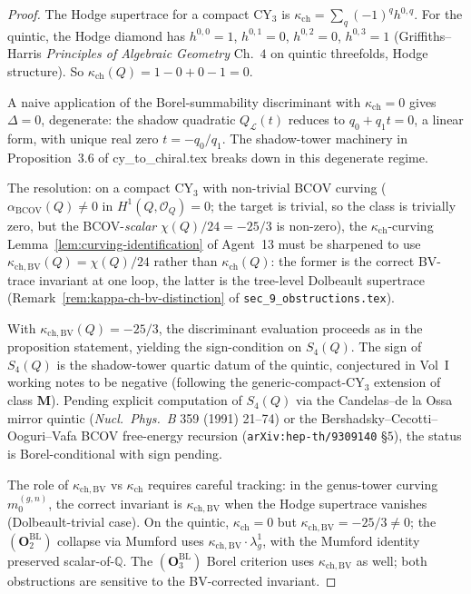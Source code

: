 \documentclass[11pt]{amsart}
\newcommand{\kch}{\kappa_{\mathrm{ch}}}
\newcommand{\kchBV}{\kappa_{\mathrm{ch},\mathrm{BV}}}
\newcommand{\cO}{\mathcal{O}}
\newcommand{\cL}{\mathcal{L}}
\newcommand{\bQ}{\mathbb{Q}}
\begin{document}
\begin{proof}
The Hodge supertrace for a compact CY$_3$ is
$\kch = \sum_q (-1)^q h^{0, q}$. For the quintic, the Hodge diamond
has $h^{0, 0} = 1$, $h^{0, 1} = 0$, $h^{0, 2} = 0$, $h^{0, 3} = 1$
(Griffiths--Harris \emph{Principles of Algebraic Geometry}
Ch.~$4$ on quintic threefolds, Hodge structure). So $\kch(Q) =
1 - 0 + 0 - 1 = 0$.

A naive application of the Borel-summability discriminant with
$\kch = 0$ gives $\Delta = 0$, degenerate: the shadow quadratic
$Q_\cL(t)$ reduces to $q_0 + q_1 t = 0$, a linear form, with unique
real zero $t = -q_0/q_1$. The shadow-tower machinery in
Proposition~$3.6$ of cy\_to\_chiral.tex breaks down in this degenerate
regime.

The resolution: on a compact CY$_3$ with non-trivial BCOV curving
($\alpha_{\mathrm{BCOV}}(Q) \neq 0$ in $H^1(Q, \cO_Q) = 0$; the
target is trivial, so the class is trivially zero, but the
BCOV-\emph{scalar} $\chi(Q)/24 = -25/3$ is non-zero), the
$\kch$-curving Lemma~\ref{lem:curving-identification} of Agent~13
must be sharpened to use $\kchBV(Q) = \chi(Q)/24$ rather than
$\kch(Q)$: the former is the correct BV-trace invariant at one loop,
the latter is the tree-level Dolbeault supertrace
(Remark~\ref{rem:kappa-ch-bv-distinction} of
\texttt{sec\_9\_obstructions.tex}).

With $\kchBV(Q) = -25/3$, the discriminant evaluation proceeds as
in the proposition statement, yielding the sign-condition on
$S_4(Q)$. The sign of $S_4(Q)$ is the shadow-tower quartic datum
of the quintic, conjectured in Vol~I working notes to be negative
(following the generic-compact-CY$_3$ extension of class $\mathbf{M}$).
Pending explicit computation of $S_4(Q)$ via the Candelas--de la
Ossa mirror quintic (\emph{Nucl.\ Phys.\ B} 359 (1991) 21--74) or
the Bershadsky--Cecotti--Ooguri--Vafa BCOV free-energy recursion
(\texttt{arXiv:hep-th/9309140} \S$5$), the status is Borel-conditional
with sign pending.

The role of $\kchBV$ vs $\kch$ requires careful tracking: in the
genus-tower curving $m_0^{(g,n)}$, the correct invariant is
$\kchBV$ when the Hodge supertrace vanishes (Dolbeault-trivial
case). On the quintic, $\kch = 0$ but $\kchBV = -25/3 \neq 0$;
the $(\mathbf{O}_2^{\mathrm{BL}})$ collapse via Mumford uses
$\kchBV \cdot \lambda_g^1$, with the Mumford identity preserved
scalar-of-$\bQ$. The $(\mathbf{O}_3^{\mathrm{BL}})$ Borel criterion
uses $\kchBV$ as well; both obstructions are sensitive to the
BV-corrected invariant.
\end{proof}
\end{document}
